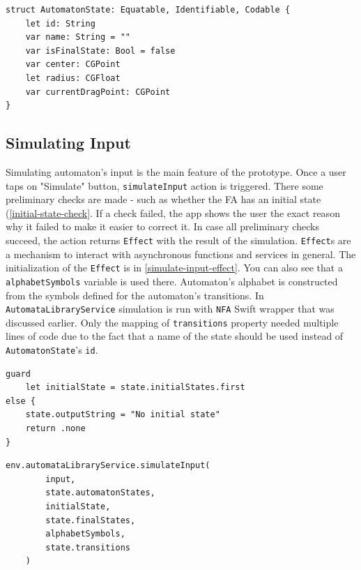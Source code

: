 \begin{lstlisting}[caption={State model}, label=state-model]
struct AutomatonState: Equatable, Identifiable, Codable {
    let id: String
    var name: String = ""
    var isFinalState: Bool = false
    var center: CGPoint
    let radius: CGFloat
    var currentDragPoint: CGPoint
}
\end{lstlisting}

\subsection{Simulating Input}

Simulating automaton's input is the main feature of the prototype. Once a user taps on "Simulate" button, \lstinline{simulateInput} action is triggered. There some preliminary checks are made - such as whether the FA has an initial state (\ref{initial-state-check}. If a check failed, the app shows the user the exact reason why it failed to make it easier to correct it. In case all preliminary checks succeed, the action returns \lstinline{Effect} with the result of the simulation. \lstinline{Effect}s are a mechanism to interact with asynchronous functions and services in general. The initialization of the \lstinline{Effect} is in \ref{simulate-input-effect}. You can also see that a \lstinline{alphabetSymbols} variable is used there. Automaton's alphabet is constructed from the symbols defined for the automaton's transitions. In \lstinline{AutomataLibraryService} simulation is run with \lstinline{NFA} Swift wrapper that was discussed earlier. Only the mapping of \lstinline{transitions} property needed multiple lines of code due to the fact that a name of the state should be used instead of \lstinline{AutomatonState}'s \lstinline{id}.

\begin{lstlisting}[caption={Check for initiail state}, label=initial-state-check]
guard
    let initialState = state.initialStates.first
else {
    state.outputString = "No initial state"
    return .none
}
\end{lstlisting}   

\begin{lstlisting}[caption={Effect for simulating input}, label=simulate-input-effect]
env.automataLibraryService.simulateInput(
        input,
        state.automatonStates,
        initialState,
        state.finalStates,
        alphabetSymbols,
        state.transitions
    )
\end{lstlisting}

